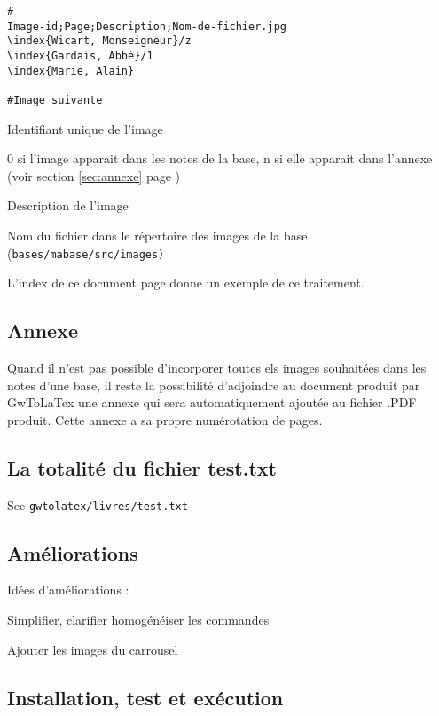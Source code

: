 \begin{verbatim}
#
Image-id;Page;Description;Nom-de-fichier.jpg
\index{Wicart, Monseigneur}/z
\index{Gardais, Abbé}/1
\index{Marie, Alain}

#Image suivante
\end{verbatim}
\begin{description}[style=nextline]
\item[Image-id] Identifiant unique de l'image
\item[Page] 0 si l'image apparait dans les notes de la base, n si elle apparait
dans l'annexe (voir section \ref{sec:annexe} page \pageref{annexe}) 
\item[Description] Description de l'image
\item[Nom-de-fichier] Nom du fichier dans le répertoire des images de la base
(\tt{bases/mabase/src/images})
\end{description}

L'index de ce document page \pageref{index} donne un exemple de ce traitement.

\subsection{Annexe}
Quand il n'est pas possible d'incorporer toutes els images souhaitées dans les
notes d'une base, il reste la possibilité d'adjoindre au document produit par 
GwToLaTex une annexe qui sera automatiquement ajoutée au fichier .PDF produit.
Cette annexe a sa propre numérotation de pages.

\subsection{La totalité du fichier test.txt}

See \verb|gwtolatex/livres/test.txt|

\subsection{Améliorations}

Idées d'améliorations :
\begin{description}
\item Simplifier, clarifier homogénéiser les commandes
\item Ajouter les images du carrousel
\end{description}

\subsection{Installation, test et exécution}

